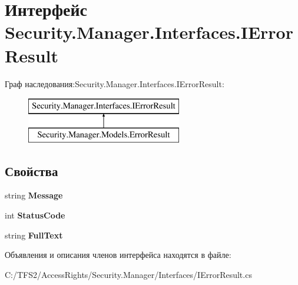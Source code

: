 \hypertarget{interface_security_1_1_manager_1_1_interfaces_1_1_i_error_result}{}\section{Интерфейс Security.\+Manager.\+Interfaces.\+I\+Error\+Result}
\label{interface_security_1_1_manager_1_1_interfaces_1_1_i_error_result}
Граф наследования\+:Security.\+Manager.\+Interfaces.\+I\+Error\+Result\+:\begin{figure}[H]
\begin{center}
\leavevmode
\includegraphics[height=2.000000cm]{d7/d5d/interface_security_1_1_manager_1_1_interfaces_1_1_i_error_result}
\end{center}
\end{figure}
\subsection*{Свойства}
\begin{DoxyCompactItemize}
\item 
\mbox{\label{interface_security_1_1_manager_1_1_interfaces_1_1_i_error_result_a9b8f1d4a98b41ea3869e39afac1b7d70}} 
string {\bfseries Message}
\item 
\mbox{\label{interface_security_1_1_manager_1_1_interfaces_1_1_i_error_result_abd3ec7c129ea8e84dd5f91942d9e23cd}} 
int {\bfseries Status\+Code}
\item 
\mbox{\label{interface_security_1_1_manager_1_1_interfaces_1_1_i_error_result_a246bae6803c0f8f1cf8513582c96996b}} 
string {\bfseries Full\+Text}
\end{DoxyCompactItemize}


Объявления и описания членов интерфейса находятся в файле\+:\begin{DoxyCompactItemize}
\item 
C\+:/\+T\+F\+S2/\+Access\+Rights/\+Security.\+Manager/\+Interfaces/I\+Error\+Result.\+cs\end{DoxyCompactItemize}
